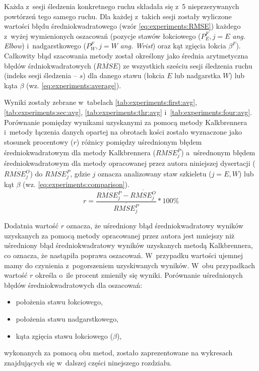 Każda z~sesji śledzenia konkretnego ruchu składała się z~5 nieprzerywanych powtórzeń tego samego ruchu. Dla każdej z~takich sesji zostały wyliczone wartości błędu średniokwadratowego  (wzór \ref{eq:experiments:RMSE}) każdego z~wyżej wymienionych oszacowań (pozycje stawów łokciowego ($P^F_E, j = E$  \emph{ang. Elbow}) i~nadgarstkowego ($P^F_W, j = W$ \emph{ang. Wrist}) oraz kąt zgięcia łokcia $\beta^F$). Całkowity błąd szacowania metody został określony jako średnia arytmetyczna błędów śrdniokwadratowych ($\overline{RMSE}$) ze wszystkich sześciu sesji śledzenia ruchu (indeks sesji śledzenia -- $s$) dla danego stawu (łokcia $E$ lub nadgarstka $W$) lub kąta $\beta$ (wz. \ref{eq:experiments:average}).

Wyniki zostały zebrane w~tabelach \ref{tab:experiments:first:avg}, \ref{tab:experiments:sec:avg}, \ref{tab:experiments:thr:avg} i~\ref{tab:experiments:four:avg}. Porównanie pomiędzy wynikami uzyskanymi za pomocą metody Kalkbrennera i~metody łączenia danych opartej na obrotach kości zostało wyznaczone jako stosunek procentowy ($r$) różnicy pomiędzy uśrednionym błędem średniokwadratowym dla metody Kalkbrennera ($\overline{RMSE^P_j}$) a~uśrednonym błędem średniokwadratowym dla metody opracowanej przez autora niniejszej dysertacji ($\overline{RMSE^O_j}$) do $\overline{RMSE^P_j}$, gdzie $j$ oznacza analizowany staw szkieletu ($j=E, W$) lub kąt $\beta$ (wz. \ref{eq:experiments:comparison}). \\
						
\begin{equation}
	r = \frac{\overline{RMSE^P_j} - \overline{RMSE^O_j}}{\overline{RMSE^P_j}} * 100\%
	\label{eq:experiments:comparison}
\end{equation}
						
Dodatnia wartość $r$ oznacza, że uśredniony błąd średniokwadratowy wyników uzyskanych za pomocą metody opracowanej przez autora jest mniejszy niż uśredniony błąd średniokwadratowy wyników uzyskanych metodą Kalkbrennera, co oznacza, że nastąpiła poprawa oszacowań. W~przypadku wartości ujemnej mamy do czynienia z~pogorszeniem uzyskiwanych wyników. W~obu przypadkach wartość $r$ określa o~ile procent zmieniły się wyniki. Porównanie uśrednionych błędów średniokwadratowych dla oszacowań:
\begin{itemize}
	\item położenia stawu łokciowego,
	\item położenia stawu nadgarstkowego,
	\item kąta zgięcia stawu łokciowego ($\beta$),
\end{itemize}
wykonanych za pomocą obu metod, zostało zaprezentowane na wykresach znajdujących się w~dalszej części ninejszego rozdziału.
						
